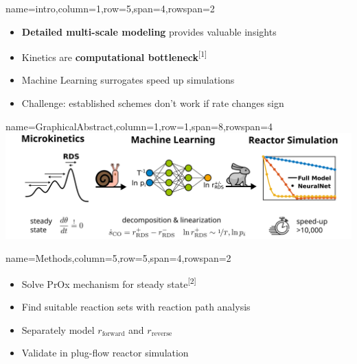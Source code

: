 \documentclass[
	accentcolor=3c,
	boxstyle=colored %
	]{tudasciposter}
\begin{document}
\begin{tcbposter}[
	poster={
		columns=8,
		rows=12,
		spacing=1cm,
	},]

\begin{posterboxenv}[title=1. Introduction]{name=intro,column=1,row=5,span=4,rowspan=2}
	\vspace{-1.6cm} %
	\begin{itemize}
		\item \textbf{Detailed multi-scale modeling} provides valuable insights
		\item Kinetics are \textbf{computational bottleneck}\textsuperscript{[1]}
		\item Machine Learning surrogates speed up simulations
		\item Challenge: established schemes don't work if rate changes sign
	\end{itemize}
\end{posterboxenv}

\begin{posterboxenv}{name=GraphicalAbstract,column=1,row=1,span=8,rowspan=4}
	\centering
	\includegraphics[width=\linewidth]{abb/Graphical_Abstract_alternative_fine}
\end{posterboxenv}

\begin{posterboxenv}[title=2. Methods]{name=Methods,column=5,row=5,span=4,rowspan=2}
	\vspace{-1.6cm} %
	\begin{itemize}
		\item Solve PrOx mechanism for steady state\textsuperscript{[2]}  %
		\item Find suitable reaction sets with reaction path analysis		
		\item Separately model $r_\text{forward}$ and $r_\text{reverse}$	
		\item Validate in plug-flow reactor simulation
	\end{itemize}


\end{posterboxenv}
\end{tcbposter}
\end{document}
